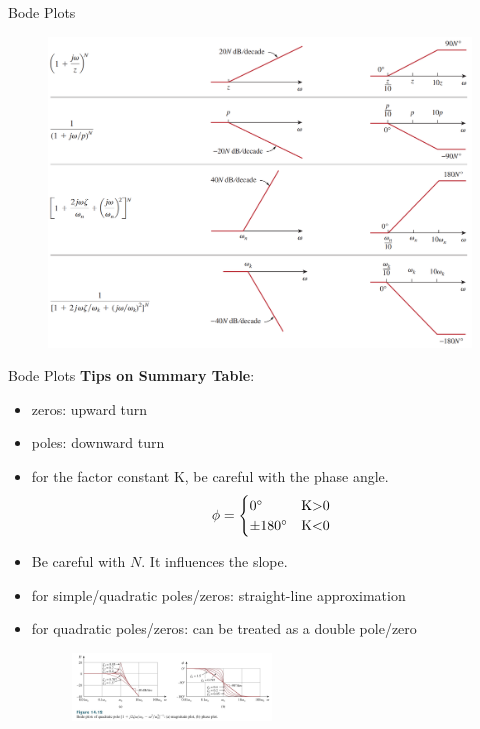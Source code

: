 \documentclass{beamer}
\begin{document}

\begin{frame}{Bode Plots}
\begin{figure}[H]
    \centering
    \includegraphics[width=\textwidth]{C14/bode2.png}
\end{figure}
\end{frame}




\begin{frame}{Bode Plots}
\textbf{Tips on Summary Table}:
\begin{itemize}
\item zeros: upward turn
\item poles: downward turn
\item for the factor constant K, be careful with the phase angle.
$$\phi=
\begin{cases}
0^{\circ}& \text{K\textgreater 0}\\
\pm 180^{\circ}& \text{K\textless 0}
\end{cases}$$
\item Be careful with $N$. It influences the slope.
\item for simple/quadratic poles/zeros: straight-line approximation
\item for quadratic poles/zeros: can be treated as a double pole/zero
\begin{figure}[H]
        \centering
        \includegraphics[width=0.5\textwidth]{C14/quadratic.jpg}
    \end{figure}
\end{itemize}
\end{frame}
\end{document}
